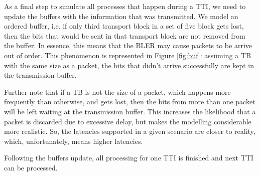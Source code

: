 As a final step to simulate all processes that happen during a TTI, we need to update the buffers with the information that was transmitted. We model an ordered buffer, i.e. if only third transport block in a set of five block gets lost, then the bits that would be sent in that transport block are not removed from the buffer.
In essence, this means that the BLER may cause packets to be arrive out of order. This phenomenon is represented in Figure \ref{fig:buf}: assuming a TB with the same size as a packet, the bits that didn't arrive successfully are kept in the transmission buffer.



Further note that if a TB is not the size of a packet, which happens more frequently than otherwise, and gets lost, then the bits from more than one packet will be left waiting at the transmission buffer. This increases the likelihood that a packet is discarded due to excessive delay, but makes the modelling considerable more realistic. So, the latencies supported in a given scenario are closer to reality, which, unfortunately, means higher latencies.

Following the buffers update, all processing for one TTI is finished and next TTI can be processed.






